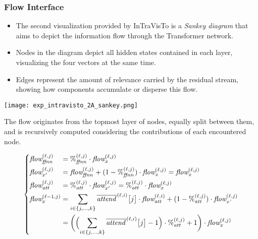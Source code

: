 \documentclass[aspectratio=169, 12pt]{beamer}
\begin{document}
    \subsubsection{Flow Interface}
    \begin{frame}{}
        \begin{minipage}{0.59\textwidth}
            \begin{itemize}
                \item The second visualization provided by InTraVisTo is a \emph{Sankey diagram} that aims to depict the information flow through the Transformer network.
                \item Nodes in the diagram depict all hidden states contained in each layer, visualizing the four vectors at the same time.
                \item Edges represent the amount of relevance carried by the residual stream, showing how components accumulate or disperse this flow.
            \end{itemize}
        \end{minipage}%
        \begin{minipage}{0.41\textwidth}
            \centering
            \texttt{[image: exp\_intravisto\_2A\_sankey.png]}
        \end{minipage}
    \end{frame}

    \begin{frame}{}
        The flow originates from the topmost layer of nodes, equally split between them, and is recursively computed considering the contributions of each encountered node.

        \begin{equation*}
            \left\{
            \begin{alignedat}{2}
                &\textit{flow}_{\textit{ffnn}}^{(\ell,j)} &&= {\%}_{\textit{ffnn}}^{(\ell,j)} \cdot \textit{flow}_{x}^{(\ell,j)} \\
                &\textit{flow}_{x'}^{(\ell,j)} &&= \textit{flow}_{\textit{ffnn}}^{(\ell,j)} + (1 - {\%}_{\textit{ffnn}}^{(\ell,j)}) \cdot \textit{flow}_{\textit{x}}^{(\ell,j)} = \textit{flow}_{\textit{x}}^{(\ell,j)} \\
                &\textit{flow}_{\textit{att}}^{(\ell,j)} &&= {\%}_{\textit{att}}^{(\ell,j)} \cdot \textit{flow}_{x'}^{(\ell,j)} = {\%}_{\textit{att}}^{(\ell,j)} \cdot \textit{flow}_{x}^{(\ell,j)} \\
                &\textit{flow}_{x}^{(\ell-1,j)} &&= \sum_{i\in\{j,\ldots,k\}}{\overline{\textit{attend}{\,}}^{(\ell,i)}\bigl[j\bigr]}\cdot\textit{flow}_{\textit{att}}^{(\ell,i)} + ( 1 - {\%}_{\textit{att}}^{(\ell,j)})\cdot \textit{flow}_{\textit{x'}}^{(\ell,j)} \\
                    &\quad &&= \biggl(\Bigl(\sum_{i\in\{j,\ldots,k\}}\overline{\textit{attend}{\,}}^{(\ell,i)}\bigl[j\bigr] - 1\Bigr)\cdot{\%}_{\textit{att}}^{(\ell,j)} + 1\biggr) \cdot \textit{flow}_{\textit{x}}^{(\ell,j)}
            \end{alignedat}
            \right.
        \end{equation*}
    \end{frame}
\end{document}
